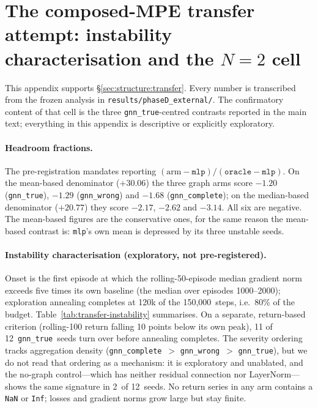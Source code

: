 \documentclass[10pt]{article}
\newcommand{\gtrue}{\texttt{gnn\_true}}
\newcommand{\gwrong}{\texttt{gnn\_wrong}}
\newcommand{\gcomplete}{\texttt{gnn\_complete}}
\newcommand{\mlpc}{\texttt{mlp}}
\newcommand{\PDseeds}{12}
\newcommand{\PDsteps}{150{,}000}
\newcommand{\PDoracleGap}{+30.06}      %
\newcommand{\PDhrTrue}{-1.20}          %
\newcommand{\PDhrWrong}{-1.29}
\newcommand{\PDhrComplete}{-1.68}
\newcommand{\PDhrTrueMed}{-2.17}       %
\newcommand{\PDhrWrongMed}{-2.62}
\newcommand{\PDhrCompleteMed}{-3.14}
\newcommand{\PDblowMlp}{2}
\begin{document}
\section{The composed-MPE transfer attempt: instability characterisation and
the \texorpdfstring{$N{=}2$}{N=2} cell}
\label{app:transfer}

This appendix supports \S\ref{sec:structure:transfer}. Every number is
transcribed from the frozen analysis in \texttt{results/phaseD\_external/}.
The confirmatory content of that cell is the three \gtrue-centred contrasts
reported in the main text; everything in this appendix is descriptive or
explicitly exploratory.

\paragraph{Headroom fractions.} The pre-registration mandates reporting
$(\text{arm}-\mlpc)/(\texttt{oracle}-\mlpc)$. On the mean-based denominator
($\PDoracleGap$) the three graph arms score $\PDhrTrue$ (\gtrue), $\PDhrWrong$
(\gwrong) and $\PDhrComplete$ (\gcomplete); on the median-based denominator
($+20.77$) they score $\PDhrTrueMed$, $\PDhrWrongMed$ and $\PDhrCompleteMed$.
All six are negative. The mean-based figures are the conservative ones, for the
same reason the mean-based contrast is: \mlpc's own mean is depressed by its
three unstable seeds.

\paragraph{Instability characterisation (exploratory, not pre-registered).}
Onset is the first episode at which the rolling-50-episode median gradient norm
exceeds five times its own baseline (the median over episodes 1000--2000);
exploration annealing completes at 120k of the \PDsteps\ steps, i.e.\ 80\% of
the budget. Table~\ref{tab:transfer-instability} summarises. On a separate,
return-based criterion (rolling-100 return falling 10 points below its own
peak), 11 of \PDseeds\ \gtrue\ seeds turn over before annealing completes. The
severity ordering tracks aggregation density (\gcomplete\ $>$ \gwrong\ $>$
\gtrue), but we do not read that ordering as a mechanism: it is exploratory and
unablated, and the no-graph control---which has neither residual connection nor
LayerNorm---shows the same signature in \PDblowMlp\ of \PDseeds\ seeds. No
return series in any arm contains a \texttt{NaN} or \texttt{Inf}; losses and
gradient norms grow large but stay finite.
\end{document}
